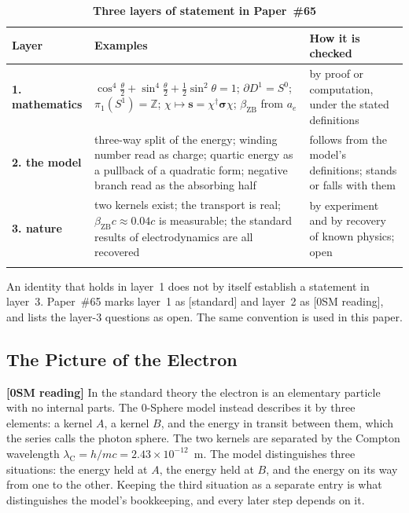 \documentclass[%
 reprint, amsmath,amssymb, aps, prb, ]{revtex4-2}
\numberwithin{equation}{section}
\newcommand{\iphase}{\theta}
\newcommand{\betaZB}{\beta_{\text{ZB}}}
\newcommand{\lambdaC}{\lambda_{\text{C}}}
\begin{document}
\begin{table}[t!]
\centering
\caption{\textbf{Three layers of statement in Paper~\#65}}
\label{tab:layers}
\renewcommand{\arraystretch}{1.4}
\setlength{\tabcolsep}{8pt}
\begin{tabular}{>{\raggedright\arraybackslash}p{3.0cm}>{\raggedright\arraybackslash}p{6.6cm}>{\raggedright\arraybackslash}p{5.4cm}}
\toprule
\textbf{Layer} & \textbf{Examples} & \textbf{How it is checked} \\
\midrule
\textcolor{pass}{\textbf{1. mathematics}} & $\cos^{4}\!\tfrac{\iphase}{2}+\sin^{4}\!\tfrac{\iphase}{2}+\tfrac12\sin^{2}\iphase = 1$; $\partial D^{1} = S^{0}$; $\pi_1(S^{1}) = \mathbb{Z}$; $\chi \mapsto \mathbf{s} = \chi^{\dagger}\bm{\sigma}\chi$; $\betaZB$ from $a_e$ & by proof or computation, under the stated definitions \\
\addlinespace[0.3cm]
\textcolor{kB}{\textbf{2. the model}} & three-way split of the energy; winding number read as charge; quartic energy as a pullback of a quadratic form; negative branch read as the absorbing half & follows from the model's definitions; stands or falls with them \\
\addlinespace[0.3cm]
\textcolor{fail}{\textbf{3. nature}} & two kernels exist; the transport is real; $\betaZB c \approx 0.04c$ is measurable; the standard results of electrodynamics are all recovered & by experiment and by recovery of known physics; open \\
\addlinespace[0.2cm]
\bottomrule
\end{tabular}
\vspace{0.2cm}
\begin{minipage}{0.95\textwidth}
\justifying\footnotesize
An identity that holds in layer~1 does not by itself establish a statement in layer~3. Paper~\#65 marks layer~1 as [standard] and layer~2 as [0SM reading], and lists the layer-3 questions as open. The same convention is used in this paper.
\end{minipage}
\end{table}

\subsection{The Picture of the Electron}
\label{subsec:g_picture}

\textbf{[0SM reading]} In the standard theory the electron is an elementary particle with no internal parts. The 0-Sphere model instead describes it by three elements: a kernel $A$, a kernel $B$, and the energy in transit between them, which the series calls the photon sphere. The two kernels are separated by the Compton wavelength $\lambdaC = h/mc = 2.43\times10^{-12}$~m. The model distinguishes three situations: the energy held at $A$, the energy held at $B$, and the energy on its way from one to the other. Keeping the third situation as a separate entry is what distinguishes the model's bookkeeping, and every later step depends on it.
\end{document}
